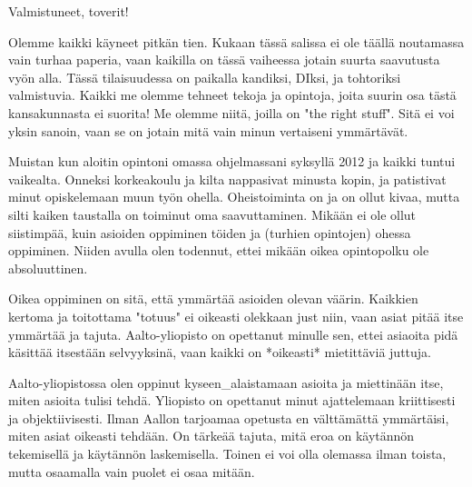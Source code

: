 Valmistuneet, toverit!

Olemme kaikki käyneet pitkän tien. Kukaan tässä salissa ei ole täällä noutamassa vain turhaa paperia, vaan kaikilla on tässä vaiheessa jotain suurta saavutusta vyön alla. Tässä tilaisuudessa on paikalla kandiksi, DIksi, ja tohtoriksi valmistuvia. Kaikki me olemme tehneet tekoja ja opintoja, joita suurin osa tästä kansakunnasta ei suorita! Me olemme niitä, joilla on "the right stuff". Sitä ei voi yksin sanoin, vaan se on jotain mitä vain minun vertaiseni ymmärtävät.

Muistan kun aloitin opintoni omassa ohjelmassani syksyllä 2012 ja kaikki tuntui vaikealta. Onneksi korkeakoulu ja kilta nappasivat minusta kopin, ja patistivat minut opiskelemaan muun työn ohella. Oheistoiminta on ja on ollut kivaa, mutta silti kaiken taustalla on toiminut oma saavuttaminen. Mikään ei ole ollut siistimpää, kuin asioiden oppiminen töiden ja (turhien opintojen) ohessa oppiminen. Niiden avulla olen todennut, ettei mikään oikea opintopolku ole absoluuttinen.

Oikea oppiminen on sitä, että ymmärtää asioiden olevan väärin. Kaikkien kertoma ja toitottama "totuus" ei oikeasti olekkaan just niin, vaan asiat pitää itse ymmärtää ja tajuta. Aalto-yliopisto on opettanut minulle sen, ettei asiaoita pidä käsittää itsestään selvyyksinä, vaan kaikki on *oikeasti* mietittäviä juttuja.

Aalto-yliopistossa olen oppinut kyseen_alaistamaan asioita ja miettinään itse, miten asioita tulisi tehdä. Yliopisto on opettanut minut ajattelemaan kriittisesti ja objektiivisesti. Ilman Aallon tarjoamaa opetusta en välttämättä ymmärtäisi, miten asiat oikeasti tehdään. On tärkeää tajuta, mitä eroa on käytännön tekemisellä ja käytännön laskemisella. Toinen ei voi olla olemassa ilman toista, mutta osaamalla vain puolet ei osaa mitään.
